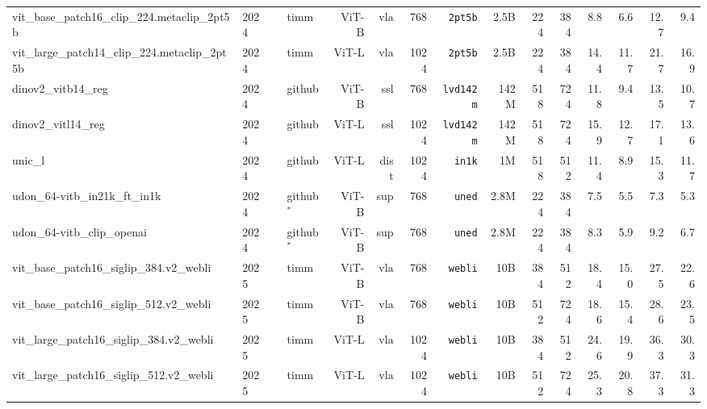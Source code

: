 \begin{tabular}{llllrrrrrrrRRRR}
vit\_base\_patch16\_clip\_224.metaclip\_2pt5b     & 2024 & \cite{metaclip}          & timm        & ViT-B & vla      & 768  & \texttt{2pt5b}     & 2.5B & 224 & 384 & 8.8  & 6.6  & 12.7 & 9.4  \\
vit\_large\_patch14\_clip\_224.metaclip\_2pt5b    & 2024 & \cite{metaclip}          & timm        & ViT-L & vla      & 1024 & \texttt{2pt5b}     & 2.5B & 224 & 384 & 14.4 & 11.7 & 21.7 & 16.9 \\
dinov2\_vitb14\_reg                               & 2024 & \cite{odm+24,doj+23}     & github      & ViT-B & ssl      & 768  & \texttt{lvd142m}   & 142M & 518 & 724 & 11.8 & 9.4  & 13.5 & 10.7 \\
dinov2\_vitl14\_reg                               & 2024 & \cite{odm+24,doj+23}     & github      & ViT-L & ssl      & 1024 & \texttt{lvd142m}   & 142M & 518 & 724 & 15.9 & 12.7 & 17.1 & 13.6 \\
unic\_l                                           & 2024 & \cite{swl+24}            & github      & ViT-L & dist     & 1024 & \texttt{in1k}      & 1M   & 518 & 512 & 11.4 & 8.9  & 15.3 & 11.7 \\
udon\_64-vitb\_in21k\_ft\_in1k                    & 2024 & \cite{yca+24}            & github$^*$  & ViT-B & sup      & 768  & \texttt{uned}      & 2.8M & 224 & 384 & 7.5  & 5.5  & 7.3  & 5.3  \\
udon\_64-vitb\_clip\_openai                       & 2024 & \cite{yca+24}            & github$^*$  & ViT-B & sup      & 768  & \texttt{uned}      & 2.8M & 224 & 384 & 8.3  & 5.9  & 9.2  & 6.7  \\
vit\_base\_patch16\_siglip\_384.v2\_webli         & 2025 & \cite{siglip2}           & timm        & ViT-B & vla      & 768  & \texttt{webli}     & 10B  & 384 & 512 & 18.4 & 15.0 & 27.5 & 22.6 \\
vit\_base\_patch16\_siglip\_512.v2\_webli         & 2025 & \cite{siglip2}           & timm        & ViT-B & vla      & 768  & \texttt{webli}     & 10B  & 512 & 724 & 18.6 & 15.4 & 28.6 & 23.5 \\
vit\_large\_patch16\_siglip\_384.v2\_webli        & 2025 & \cite{siglip2}           & timm        & ViT-L & vla      & 1024 & \texttt{webli}     & 10B  & 384 & 512 & 24.6 & 19.9 & 36.3 & 30.3 \\
vit\_large\_patch16\_siglip\_512.v2\_webli        & 2025 & \cite{siglip2}           & timm        & ViT-L & vla      & 1024 & \texttt{webli}     & 10B  & 512 & 724 & 25.3 & 20.8 & 37.3 & 31.3 \\




\bottomrule
\end{tabular}